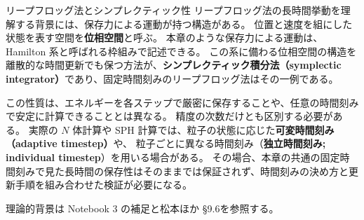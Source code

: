 \begin{topicblock}{リープフロッグ法とシンプレクティック性}
リープフロッグ法の長時間挙動を理解する背景には、保存力による運動が持つ構造がある。
位置と速度を組にした状態を表す空間を\textbf{位相空間}と呼ぶ。
本章のような保存力による運動は、Hamilton 系と呼ばれる枠組みで記述できる。
この系に備わる位相空間の構造を離散的な時間更新でも保つ方法が、\textbf{シンプレクティック積分法（symplectic integrator）}であり、固定時間刻みのリープフロッグ法はその一例である。

この性質は、エネルギーを各ステップで厳密に保存することや、任意の時間刻みで安定に計算できることとは異なる。
精度の次数だけとも区別する必要がある。
実際の $N$ 体計算や SPH 計算では、粒子の状態に応じた\textbf{可変時間刻み（adaptive timestep）}や、
粒子ごとに異なる時間刻み（\textbf{独立時間刻み; individual timestep}）を用いる場合がある。
その場合、本章の共通の固定時間刻みで見た長時間の保存性はそのままでは保証されず、時間刻みの決め方と更新手順を組み合わせた検証が必要になる。

理論的背景は Notebook 3 の補足と松本ほか §9.6\cite{matsumoto}を参照する。
\end{topicblock}


